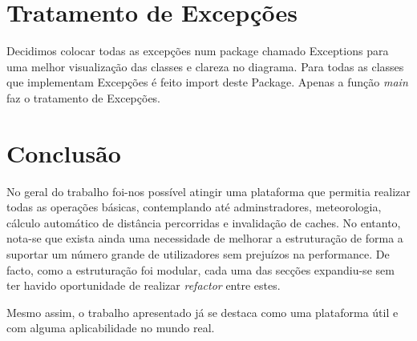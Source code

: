 \documentclass{article}
\begin{document}
\pagebreak
\section{Tratamento de Excepções}
\quad Decidimos colocar todas as excepções num package chamado Exceptions para uma melhor visualização das classes e
clareza no diagrama. Para todas as classes que implementam Excepções é feito import deste Package. Apenas a função
\emph{ main} faz o tratamento de Excepções.
\pagebreak
\section{Conclusão}
No geral do trabalho foi-nos possível atingir uma plataforma que permitia realizar todas as operações básicas, contemplando até adminstradores, meteorologia, cálculo automático de distância percorridas e invalidação de caches. No entanto, nota-se que exista ainda uma necessidade de melhorar a estruturação de forma a suportar um número grande de utilizadores sem prejuízos na performance. De facto, como a estruturação foi modular, cada uma das secções expandiu-se sem ter havido oportunidade de realizar \emph{refactor} entre estes.

Mesmo assim, o trabalho apresentado já se destaca como uma plataforma útil e com alguma aplicabilidade no mundo real.
\end{document}
